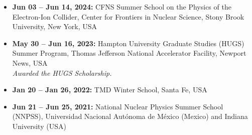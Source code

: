 \documentclass[11pt]{article}
\begin{document}
\begin{itemize}
    \item \textbf{Jun 03 – Jun 14, 2024:} CFNS Summer School on the Physics of the Electron-Ion Collider, Center for Frontiers in Nuclear Science, Stony Brook University, New York, USA

    \item \textbf{May 30 – Jun 16, 2023:} Hampton University Graduate Studies (HUGS) Summer Program, Thomas Jefferson National Accelerator Facility, Newport News, USA \\
    \textit{Awarded the HUGS Scholarship.}

    \item \textbf{Jan 20 – Jan 26, 2022:} TMD Winter School, Santa Fe, USA

    \item \textbf{Jun 21 – Jun 25, 2021:} National Nuclear Physics Summer School (NNPSS), Universidad Nacional Autónoma de México (Mexico) and Indiana University (USA)
\end{itemize}
\end{document}
